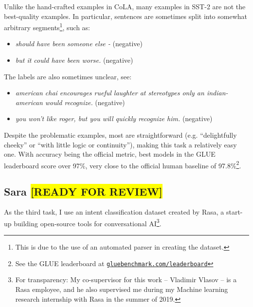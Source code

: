 \documentclass[bsc,frontabs,twoside,singlespacing,parskip,deptreport]{infthesis}
\def\reviewready{\colorbox{yellow}{[READY FOR REVIEW]}}
\newcommand\rurl[1]{%
  \href{https://#1}{\nolinkurl{#1}}%
}
\begin{document}
{{{      Unlike the hand-crafted examples in CoLA, many examples in SST-2 are not the best-quality examples. In particular, sentences are sometimes split into somewhat arbitrary segments\footnote{This is due to the use of an automated parser in creating the dataset.}, such as:
      \begin{itemize}
        \item \textit{should have been someone else - } (negative)
        \item \textit{but it could have been worse.} (negative)
      \end{itemize}
      
      The labels are also sometimes unclear, see:
      \begin{itemize}
        \item \textit{american chai encourages rueful laughter at stereotypes only an indian-american would recognize.} (negative)
        \item \textit{you won't like roger, but you will quickly recognize him.} (negative)
      \end{itemize}

      Despite the problematic examples, most are straightforward (e.g. ``delightfully cheeky'' or ``with little logic or continuity''), making this task a relatively easy one. With accuracy being the official metric, best models in the GLUE leaderboard score over 97\%, very close to the official human baseline of 97.8\%\footnote{See the GLUE leaderboard at \rurl{gluebenchmark.com/leaderboard}}.
    }

    \subsection{Sara \reviewready}{
      \label{sec:datasets-Sara}

      As the third task, I use an intent classification dataset created by Rasa, a start-up building open-source tools for conversational AI\footnote{For transparency: My co-supervisor for this work -- Vladimir Vlasov -- is a Rasa employee, and he also supervised me during my Machine learning research internship with Rasa in the summer of 2019.}.

}}}
\end{document}
